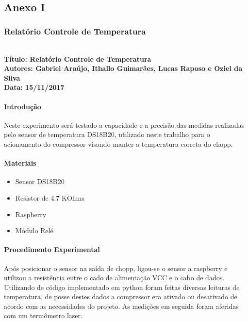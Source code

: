 \begin{anexosenv}

\partanexos

\chapter{Anexo I}

\subsection{Relatório Controle de Temperatura}
\textbf{ \\
  Título: Relatório Controle de Temperatura  \\
    Autores: Gabriel Araújo, Ithallo Guimarães, Lucas Raposo e Oziel da Silva\\
      Data: 15/11/2017} \\


\subsubsection{Introdução}
    Neste experimento será testado a capacidade e a precisão das medidas realizadas pelo sensor de temperatura DS18B20, utilizado neste trabalho para o acionamento do compressor visando manter a temperatura correta do chopp.

\subsubsection{Materiais}
\begin{itemize}
     \item Sensor DS18B20
     \item Resistor de 4.7 KOhms
     \item Raspberry
     \item Módulo Relé
         
\end{itemize}

\subsubsection{Procedimento Experimental}
     Após posicionar o sensor na saída de chopp, ligou-se o sensor a raspberry e utilizou a resistência entre o cado de alimentação VCC e o cabo de dados. Utilizando de código implementado em python foram feitas diversas leituras de temperatura, de posse destes dados a compressor era ativado ou desativado de acordo com as necessidades do projeto. As medições em seguida foram aferidas com um termômetro laser.

\end{anexosenv}
